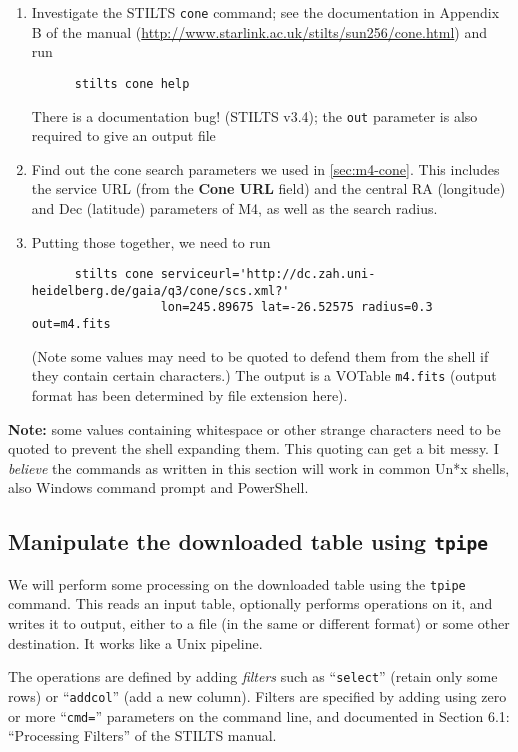 \documentclass{article}
\newcommand{\lab}[1]{{\bf #1}}
\newcommand{\paragap}{\vspace{1.5ex}}
\begin{document}
\begin{enumerate}
\item Investigate the STILTS {\tt cone} command;
      see the documentation in Appendix B of the manual
      (\url{http://www.starlink.ac.uk/stilts/sun256/cone.html})
      and run
      \preverb
      \begin{verbatim}
      stilts cone help
      \end{verbatim}
      \postverb
      There is a documentation bug! (STILTS v3.4); the {\tt out} parameter
      is also required to give an output file
\item Find out the cone search parameters we used in \ref{sec:m4-cone}.
      This includes the service URL (from the \lab{Cone URL} field)
      and the central RA (longitude) and Dec (latitude) parameters of M4,
      as well as the search radius.
\item Putting those together, we need to run
      \preverb
      \begin{verbatim}
      stilts cone serviceurl='http://dc.zah.uni-heidelberg.de/gaia/q3/cone/scs.xml?' 
                  lon=245.89675 lat=-26.52575 radius=0.3 out=m4.fits
      \end{verbatim}
      \postverb
      (Note some values may need to be quoted to defend them from the shell
      if they contain certain characters.)
      The output is a VOTable {\tt m4.fits} (output format has been
      determined by file extension here).
\end{enumerate}

{\bf Note:} some values containing whitespace or other strange
characters need to be quoted to prevent the shell expanding them.
This quoting can get a bit messy.
I {\em believe\/} the commands as written in this section will work
in common Un*x shells, also Windows command prompt and PowerShell.

\subsection{Manipulate the downloaded table using {\tt tpipe}}

We will perform some processing on the downloaded table using
the {\tt tpipe} command.
This reads an input table, optionally performs operations on it,
and writes it to output, either to a file (in the same or different format)
or some other destination.  It works like a Unix pipeline.
\paragap

The operations are defined by adding {\em filters} such as
``{\tt select}'' (retain only some rows) or ``{\tt addcol}''
(add a new column).  Filters are specified by adding using zero
or more ``{\tt cmd=}'' parameters on the command line,
and documented in Section 6.1: ``Processing Filters'' of the STILTS manual.
\paragap
\end{document}
